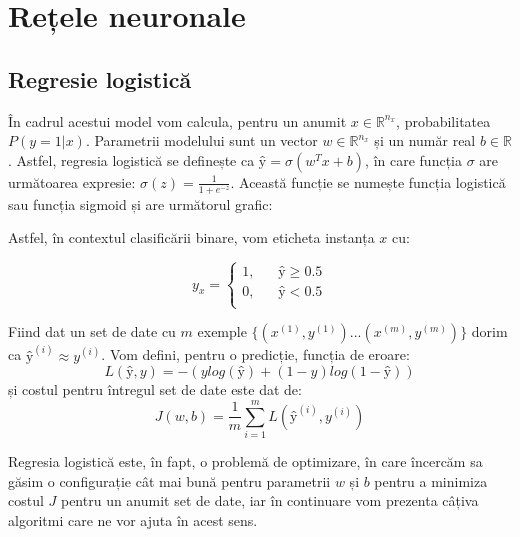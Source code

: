\def \pred {\textit{\^{y}}}

\section{Rețele neuronale}

\subsection{Regresie logistică}
În cadrul acestui model vom calcula, pentru un anumit $x \in \mathbb{R}^{n_x}$, probabilitatea $P(y=1 \vert x)$. Parametrii modelului sunt un vector $w \in \mathbb{R}^{n_x}$ și un număr real $b \in \mathbb{R}$. Astfel, regresia logistică se definește ca $\pred=\sigma(w^Tx + b)$, în care funcția $\sigma$ are următoarea expresie: $\displaystyle{\sigma(z)=\frac{1}{1 + e^{-z}}}$. Această funcție se numește funcția logistică sau funcția sigmoid și are următorul grafic:

\begin{center}
\end{center}

Astfel, în contextul clasificării binare, vom eticheta instanța $x$ cu:

\[
y_x=
	\begin{cases}
		\text{1,} &\quad \pred \geq 0.5 \\
		\text{0,} &\quad \pred < 0.5 \\
	\end{cases}
\]

Fiind dat un set de date cu $m$ exemple $\{(x^{(1)}, y^{(1)})...(x^{(m)}, y^{(m)})\}$ dorim ca $\pred^{(i)} \approx y^{(i)}$. Vom defini, pentru o predicție, funcția de eroare: $$L(\pred, y)=-(ylog(\pred) + (1-y)log(1 - \pred))$$ și costul pentru întregul set de date este dat de: $$\displaystyle{J(w,b)=\frac{1}{m}\sum\limits_{i=1}^{m}L(\pred^{(i)}, y^{(i)})}$$

Regresia logistică este, în fapt, o problemă de optimizare, în care încercăm sa găsim o configurație cât mai bună pentru parametrii $w$ și $b$ pentru a minimiza costul $J$ pentru un anumit set de date, iar în continuare vom prezenta câțiva algoritmi care ne vor ajuta în acest sens.

